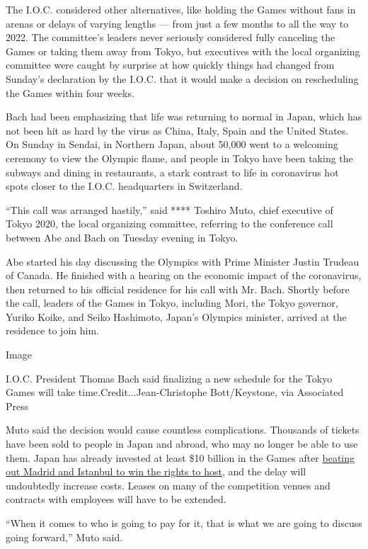 The I.O.C. considered other alternatives, like holding the Games without
fans in arenas or delays of varying lengths --- from just a few months
to all the way to 2022. The committee's leaders never seriously
considered fully canceling the Games or taking them away from Tokyo, but
executives with the local organizing committee were caught by surprise
at how quickly things had changed from Sunday's declaration by the
I.O.C. that it would make a decision on rescheduling the Games within
four weeks.

Bach had been emphasizing that life was returning to normal in Japan,
which has not been hit as hard by the virus as China, Italy, Spain and
the United States. On Sunday in Sendai, in Northern Japan, about 50,000
went to a welcoming ceremony to view the Olympic flame, and people in
Tokyo have been taking the subways and dining in restaurants, a stark
contrast to life in coronavirus hot spots closer to the I.O.C.
headquarters in Switzerland.

``This call was arranged hastily,'' said **** Toshiro Muto, chief
executive of Tokyo 2020, the local organizing committee, referring to
the conference call between Abe and Bach on Tuesday evening in Tokyo.

Abe started his day discussing the Olympics with Prime Minister Justin
Trudeau of Canada. He finished with a hearing on the economic impact of
the coronavirus, then returned to his official residence for his call
with Mr. Bach. Shortly before the call, leaders of the Games in Tokyo,
including Mori, the Tokyo governor, Yuriko Koike, and Seiko Hashimoto,
Japan's Olympics minister, arrived at the residence to join him.

Image

I.O.C. President Thomas Bach said finalizing a new schedule for the
Tokyo Games will take time.Credit...Jean-Christophe Bott/Keystone, via
Associated Press

Muto said the decision would cause countless complications. Thousands of
tickets have been sold to people in Japan and abroad, who may no longer
be able to use them. Japan has already invested at least \$10 billion in
the Games after
\href{https://www.nytimes3xbfgragh.onion/2013/09/08/sports/olympics/tokyo-wins-bid-for-2020-olympics.html}{beating
out Madrid and Istanbul to win the rights to host}, and the delay will
undoubtedly increase costs. Leases on many of the competition venues and
contracts with employees will have to be extended.

``When it comes to who is going to pay for it, that is what we are going
to discuss going forward,'' Muto said.

